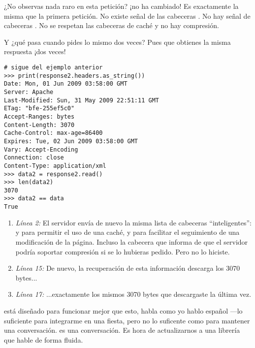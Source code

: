 ¿No observas nada raro en esta petición? ¡no ha cambiado! Es exactamente la misma que la primera petición. No existe señal de las cabeceras . No hay señal de cabeceras . No se respetan las cabeceras de caché y no hay compresión.

Y ¿qué pasa cuando pides lo mismo dos veces? Pues que obtienes la misma respuesta ¡dos veces!

\noindent\begin{minipage}{\textwidth}
\begin{lstlisting}[mathescape=True]
# sigue del ejemplo anterior
>>> print(response2.headers.as_string())
Date: Mon, 01 Jun 2009 03:58:00 GMT
Server: Apache
Last-Modified: Sun, 31 May 2009 22:51:11 GMT
ETag: "bfe-255ef5c0"
Accept-Ranges: bytes
Content-Length: 3070
Cache-Control: max-age=86400
Expires: Tue, 02 Jun 2009 03:58:00 GMT
Vary: Accept-Encoding
Connection: close
Content-Type: application/xml
>>> data2 = response2.read()
>>> len(data2)
3070
>>> data2 == data
True
\end{lstlisting}
\end{minipage}

\begin{enumerate}

\item \emph{Línea 2:} El servidor envía de nuevo la misma lista de cabeceras ``inteligentes'':  y  para permitir el uso de una caché,  y  para facilitar el seguimiento de una modificación de la página. Incluso la cabecera  que informa de que el servidor podría soportar compresión si se lo hubieras pedido. Pero no lo hiciste.

\item \emph{Línea 15:} De nuevo, la recuperación de esta información descarga los 3070 bytes...

\item \emph{Línea 17:} ...exactamente los mismos 3070 bytes que descargaste la última vez.

\end{enumerate}

 está diseñado para funcionar mejor que esto,  habla  como yo hablo español ---lo suficiente para integrarme en una fiesta, pero no lo suficente como para mantener una conversación.  es una conversación. Es hora de actualizarnos a una librería que hable  de forma fluida.


